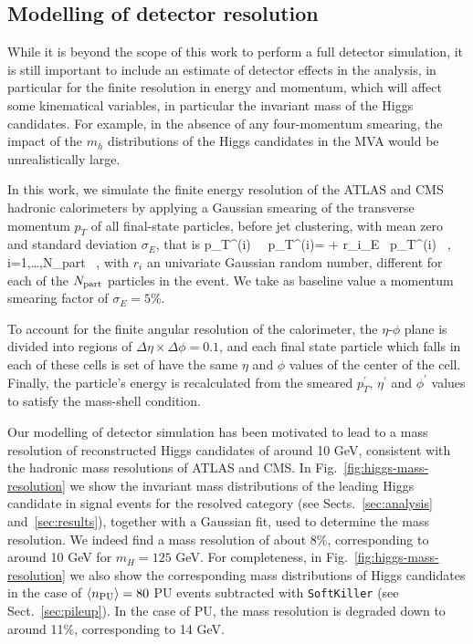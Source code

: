 \subsection{Modelling of detector resolution}
\label{sec:detectormodeling}

While it is beyond the scope of this work to perform a full
detector simulation, it is still important to include an estimate of detector
effects in the analysis, in particular for the finite resolution
in energy and momentum, which will affect some kinematical variables, in particular
the invariant mass of the Higgs candidates.
%
For example, in the absence of any four-momentum smearing, the impact of the $m_h$
distributions of the Higgs candidates in the MVA
would be unrealistically large.

In this work, we simulate the finite energy resolution of the ATLAS and CMS
hadronic calorimeters by applying a Gaussian smearing of the transverse
momentum $p_T$ of all
final-state particles, before jet clustering,
with mean zero and standard deviation $\sigma_E$, that is
%
\be
\label{eq:smearing}
p_T^{(i)} \, \to \, p_T^{(i)\prime}= + r_i\cdot\sigma_E \rp\, p_T^{(i)} \, , \quad
i=1,\ldots,N_{\rm part} \, ,
\ee
with $r_i$ an univariate Gaussian random number, different for each
of the $N_{\rm part}$ particles in the event.
%
We take as baseline value a momentum smearing
factor of $\sigma_E=5\%$.
%


To account for the finite angular resolution of the calorimeter,
the $\eta$-$\phi$ plane is divided into regions of
$\Delta \eta \times \Delta \phi=0.1$, and each final state particle
which falls in each of these cells is set of have the same $\eta$
and $\phi$ values of the center of the cell.
%
Finally, the particle's energy is recalculated from the smeared $p_T^\prime$,
$\eta^\prime$ and $\phi^\prime$ values to satisfy the mass-shell
condition.


Our modelling of detector simulation has been motivated
to lead to a mass resolution of
reconstructed Higgs candidates of around 10 GeV, consistent
with the hadronic mass resolutions of ATLAS and CMS.
%
In  Fig.~\ref{fig:higgs-mass-resolution} we show the
invariant mass distributions of the leading
Higgs candidate in signal events for the
resolved category (see Sects.~\ref{sec:analysis}
and~\ref{sec:results}), together with
a Gaussian fit,
used to determine the mass resolution.
%
We indeed  find a mass resolution of about 8\%, corresponding
    to around 10 GeV for $m_H=125$ GeV.
%
    For completeness, in Fig.~\ref{fig:higgs-mass-resolution}
    we also show the corresponding
    mass distributions of Higgs candidates
    in the case of $\left\langle n_{\rm PU}\right\rangle=80$ PU events
    subtracted with {\tt SoftKiller} (see Sect.~\ref{sec:pileup}).
    In the case of PU, the mass resolution is degraded down to
    around 11\%, corresponding to 
    14 GeV.
        
